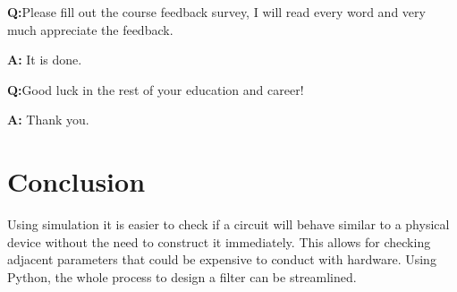 \documentclass[12pt,a4paper]{article}
\newcommand{\Q}{\leavevmode\par\textbf {Q:}}
\newcommand{\A}{\par\textbf{A:} \normalfont}
\begin{document}
\Q Please fill out the course feedback survey, I will read every word and very much appreciate the feedback.
\A It is done.

\Q  Good luck in the rest of your education and career!
\A  Thank you.



\section{Conclusion}\label{sec:res}
Using simulation it is easier to check if a circuit will behave similar to a physical device without the need to construct it immediately. This allows for checking adjacent parameters that could be expensive to conduct with hardware. Using Python, the whole process to design a filter can be streamlined.




\end{document}
